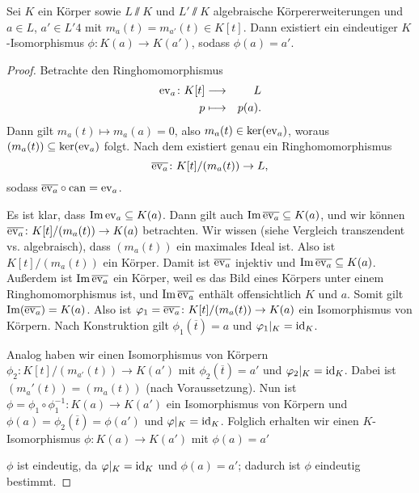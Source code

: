\documentclass[12pt,a4paper]{scrartcl}
\begin{document}
\begin{lem}
	Sei $K$ ein Körper sowie $L\sslash K$ und $L'\sslash K$ algebraische Körpererweiterungen und $a\in L$, $a'\in L'4$ mit $m_a(t)=m_{a'}(t)\in K[t]$. Dann existiert ein eindeutiger $K$-Isomorphismus $\phi\colon K(a)\to K(a')$, sodass $\phi(a) = a'$.
\end{lem}
\begin{proof}
	Betrachte den Ringhomomorphismus
	\begin{eqnarray*}
		\operatorname{ev}_a\colon K[t]&\longrightarrow& L\\
		p & \longmapsto & p(a).
	\end{eqnarray*}
	Dann gilt $m_a(t)\mapsto m_a(a) = 0$, also $m_a(t) \in \operatorname{ker}(\operatorname{ev}_a)$, woraus $(m_a(t))\subseteq \operatorname{ker}(\operatorname{ev}_a)$ folgt. Nach dem  existiert genau ein Ringhomomorphismus \[\overline{\operatorname{ev}_a}\colon K[t]/(m_a(t))\to L,\] sodass $\overline{\operatorname{ev}_a}\circ \operatorname{can} = \operatorname{ev}_a$.
	
	Es ist klar, dass $\operatorname{Im}\operatorname{ev}_a\subseteq K(a)$. Dann gilt auch $\operatorname{Im}\overline{\operatorname{ev}_a}\subseteq K(a)$, und wir können $\overline{\operatorname{ev}_a}\colon K[t]/(m_a(t))\to K(a)$ betrachten. Wir wissen (siehe Vergleich transzendent vs. algebraisch), dass $(m_a(t))$ ein maximales Ideal ist. Also ist $K[t]/(m_a(t))$ ein Körper. Damit ist $\overline{\operatorname{ev}_a}$ injektiv und $\operatorname{Im}\overline{\operatorname{ev}_a}\subseteq K(a)$. Außerdem ist $\operatorname{Im}\overline{\operatorname{ev}_a}$ ein Körper, weil es das Bild eines Körpers unter einem Ringhomomorphismus ist, und $\operatorname{Im}\overline{\operatorname{ev}_a}$ enthält offensichtlich $K$ und $a$. Somit gilt $\operatorname{Im}(\overline{\operatorname{ev}_a}) = K(a)$. Also ist $\varphi_1 = \overline{\operatorname{ev}_a}\colon K[t]/(m_a(t))\to K(a)$ ein Isomorphismus von Körpern. Nach Konstruktion gilt $\phi_1(\overline{t}) = a$ und $\varphi_1|_K = \operatorname{id}_K$.
	
	Analog haben wir einen Isomorphismus von Körpern $\phi_2: K[t]/(m_{a'}(t))\to K(a')$ mit $\phi_2(\overline{t}) =a'$ und $\varphi_2|_K  =\operatorname{id}_K$. Dabei ist $(m_a'(t)) = (m_a(t))$ (nach Voraussetzung). Nun ist $\phi = \phi_1\circ \phi_1^{-1}\colon K(a) \to K(a')$ ein Isomorphismus von Körpern und $\phi(a) = \phi_2(\overline{t}) = \phi(a')$ und $\varphi|_K = \operatorname{id}_K$. Folglich erhalten wir einen $K$-Isomorphismus $\phi\colon K(a)\to K(a')$ mit $\phi(a) = a'$
	
	$\phi$ ist eindeutig, da $\varphi|_K =\operatorname{id}_K$ und $\phi(a) =a'$; dadurch ist $\phi$ eindeutig bestimmt.
\end{proof}
\end{document}
